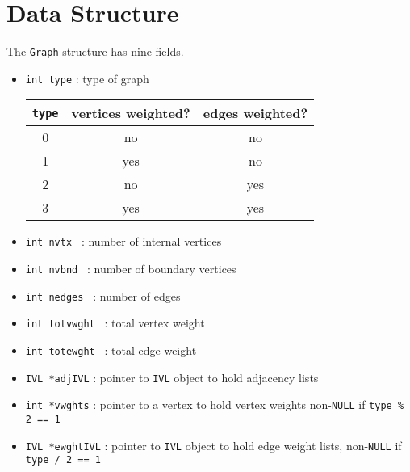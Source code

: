 \par
\section{Data Structure}
\label{section:Graph:dataStructure}
\par
The {\tt Graph} structure has nine fields.
\begin{itemize}
\item {\tt int type} : type of graph \qquad
\begin{tabular}{|c|c|c|} \hline
{\tt type} & vertices weighted? & edges weighted? \\ \hline
         0 &  no &  no \\
         1 & yes &  no \\
         2 &  no & yes \\
         3 & yes & yes \\ \hline
\end{tabular}
\item {\tt int nvtx } : number of internal vertices 
\item {\tt int nvbnd } : number of boundary vertices 
\item {\tt int nedges } : number of edges 
\item {\tt int totvwght } : total vertex weight 
\item {\tt int totewght } : total edge weight 
\item {\tt IVL *adjIVL} : 
pointer to {\tt IVL} object to hold adjacency lists
\item {\tt int *vwghts} : pointer to a vertex to hold vertex weights 
non-{\tt NULL} if {\tt type \% 2 == 1} 
\item {\tt IVL *ewghtIVL} : pointer to {\tt IVL} object to hold 
      edge weight lists, non-{\tt NULL} if {\tt type / 2 == 1} 
\end{itemize}

